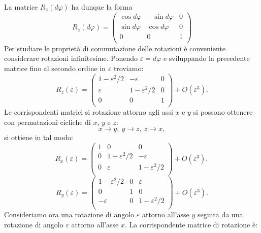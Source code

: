 \documentclass[a4paper,12pt,oneside]{book}
\begin{document}
La matrice $R_z (d\varphi)$ ha dunque la forma
\begin{equation}
R_z (d\varphi)=
\begin{pmatrix}
\cos d\varphi & -\sin d\varphi & 0\\
\sin d\varphi & \cos d\varphi & 0 \\
0 & 0 & 1 \\
\end{pmatrix}
\end{equation}
Per studiare le proprietà di commutazione delle rotazioni è conveniente considerare rotazioni infinitesime. Ponendo $\varepsilon =d\varphi$ e sviluppando la precedente matrice fino al secondo ordine in $\varepsilon$ troviamo:
\begin{equation}
R_z (\varepsilon)=
\begin{pmatrix}
1-\varepsilon ^2 /2 & -\varepsilon & 0\\
\varepsilon & 1-\varepsilon ^2/2 & 0 \\
0 & 0 & 1 \\
\end{pmatrix}
+ O(\varepsilon ^3).
\end{equation}
Le corrispondenti matrici si rotazione attorno agli assi $x$ e $y$ si possono ottenere con permutazioni cicliche di $x$, $y$ e $z$:
\begin{equation}
x\rightarrow y,\ y\rightarrow z,\ z\rightarrow x,
\end{equation}
si ottiene in tal modo:
\begin{equation}
R_x (\varepsilon)=
\begin{pmatrix}
1 & 0 & 0\\
0 & 1-\varepsilon ^2/2 & -\varepsilon \\
0 & \varepsilon & 1-\varepsilon ^2/2 \\
\end{pmatrix}
+ O(\varepsilon ^3),
\end{equation}
\begin{equation}
R_y (\varepsilon)=
\begin{pmatrix}
1-\varepsilon ^2/2 & 0 & \varepsilon\\
0 & 1 &0 \\
- \varepsilon & 0 & 1-\varepsilon ^2/2 \\
\end{pmatrix}
+ O(\varepsilon ^3).
\end{equation}
Consideriamo ora una rotazione di angolo $\varepsilon$ attorno all'asse $y$ seguita da una rotazione di angolo $\varepsilon$ attorno all'asse $x$. La corrispondente matrice di rotazione è:
\end{document}
